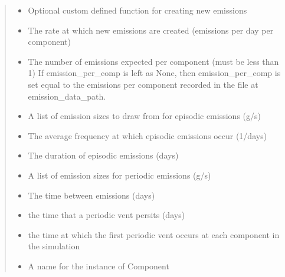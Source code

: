 \documentclass[letterpaper,10pt,english]{sphinxmanual}
\begin{document}
\begin{fulllineitems}
\begin{quote}
\begin{description}
\begin{itemize}
\item {} 
 \textendash{} Optional custom defined function for creating new emissions

\item {} 
 \textendash{} The rate at which new emissions are created (emissions per day per component)

\item {} 
 \textendash{} The number of emissions expected per component (must be less than 1)
If emission\_per\_comp is left as None, then emission\_per\_comp is set equal to the emissions per component
recorded in the file at emission\_data\_path.

\item {} 
 \textendash{} A list of emission sizes to draw from for episodic emissions (g/s)

\item {} 
 \textendash{} The average frequency at which episodic emissions occur (1/days)

\item {} 
 \textendash{} The duration of episodic emissions (days)

\item {} 
 \textendash{} A list of emission sizes for periodic emissions (g/s)

\item {} 
 \textendash{} The time between emissions (days)

\item {} 
 \textendash{} the time that a periodic vent persits (days)

\item {} 
 \textendash{} the time at which the first periodic vent occurs at each component in the simulation

\item {} 
 \textendash{} A name for the instance of Component


\end{itemize}
\end{description}
\end{quote}
\end{fulllineitems}
\end{document}
